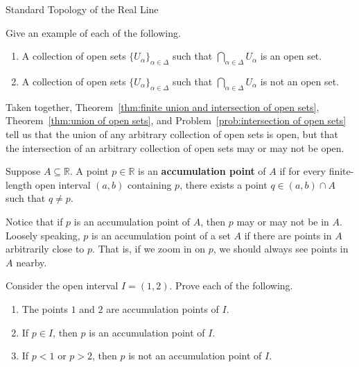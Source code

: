 \begin{section}{Standard Topology of the Real Line}
\begin{problem}\label{prob:intersection of open sets}
Give an example of each of the following.
\begin{enumerate}[label=\textrm{(\alph*)}]
\item A collection of open sets $\{U_{\alpha}\}_{\alpha\in\Delta}$ such that $\bigcap_{\alpha\in\Delta} U_{\alpha}$ is an open set.
\item A collection of open sets $\{U_{\alpha}\}_{\alpha\in\Delta}$ such that $\bigcap_{\alpha\in\Delta} U_{\alpha}$ is not an open set.
\end{enumerate}
\end{problem}

\begin{remark}\label{rem:union vs intersection of open sets}
Taken together, Theorem~\ref{thm:finite union and intersection of open sets}, Theorem~\ref{thm:union of open sets}, and Problem~\ref{prob:intersection of open sets} tell us that the union of any arbitrary collection of open sets is open, but that the intersection of an arbitrary collection of open sets may or may not be open.  
\end{remark}

\begin{definition}
Suppose $A\subseteq \mathbb{R}$. A point $p\in \mathbb{R}$ is an \textbf{accumulation point} of $A$ if for every finite-length open interval $(a,b)$ containing $p$, there exists a point $q \in (a,b)\cap A$ such that $q\neq p$.
\end{definition}

Notice that if $p$ is an accumulation point of $A$, then $p$ may or may not be in $A$. Loosely speaking, $p$ is an accumulation point of a set $A$ if there are points in $A$ arbitrarily close to $p$. That is, if we zoom in on $p$, we should always see points in $A$ nearby.

\begin{problem}
Consider the open interval $I=(1,2)$. Prove each of the following.
\begin{enumerate}[label=\textrm{(\alph*)}]
\item The points $1$ and $2$ are accumulation points of $I$.
\item If $p\in I$, then $p$ is an accumulation point of $I$.
\item If $p<1$ or $p>2$, then $p$ is not an accumulation point of $I$.
\end{enumerate}
\end{problem}


\end{section}
